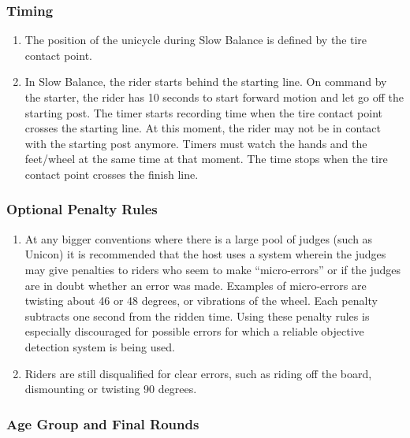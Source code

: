 \subsubsection{Timing}

\begin{enumerate}[leftmargin=1.5em,labelsep=*]
	\item The position of the unicycle during Slow Balance is defined by the tire contact point.
	
	\item In Slow Balance, the rider starts behind the starting line.
	On command by the starter, the rider has 10 seconds to start forward motion and let go off the starting post.
	The timer starts recording time when the tire contact point crosses the starting line.
	At this moment, the rider may not be in contact with the starting post anymore.
	Timers must watch the hands and the feet/wheel at the same time at that moment.
	The time stops when the tire contact point crosses the finish line.
\end{enumerate}

\subsubsection{Optional Penalty Rules}

\begin{enumerate}[leftmargin=1.5em,labelsep=*]
	\item At any bigger conventions where there is a large pool of judges (such as Unicon) it is recommended that the host uses a system wherein the judges may give penalties to riders who seem to make ``micro-errors'' or if the judges are in doubt whether an error was made.
	Examples of micro-errors are twisting about 46 or 48 degrees, or vibrations of the wheel.
	Each penalty subtracts one second from the ridden time.
	Using these penalty rules is especially discouraged for possible errors for which a reliable objective detection system is being used.
	
	\item Riders are still disqualified for clear errors, such as riding off the board, dismounting or twisting 90 degrees.
\end{enumerate}

\subsubsection{Age Group and Final Rounds}

